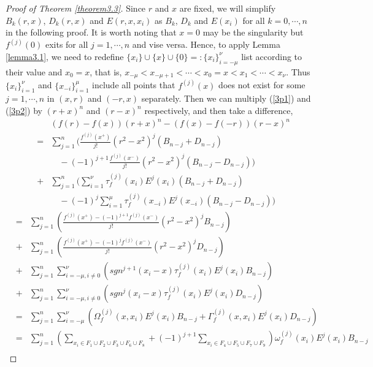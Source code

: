 \documentclass{article}
\begin{document}
\begin{proof}[Proof of Theorem \ref{theorem3.3}]
Since $r$ and $x$ are fixed, we will simplify $B_{k}(r, x)$, $D_{k}(r, x)$ and $E(r, x, x_{i})$ as $B_{k}$, $D_{k}$ and $E(x_{i})$ for all $k=0, \cdots, n$ in the following proof. It is worth noting that $x=0$ may be the singularity but $f^{(j)}(0)$ exits for all $j=1, \cdots, n$ and vise versa. Hence, to apply Lemma \ref{lemma3.1}, we need to redefine $\{x_{i}\}\cup\{x\}\cup\{0\}=:\{x_{i}\}_{i=-\mu}^{\nu}$ list according to their value and $x_{0}=x$, that is, $x_{-\mu}<x_{-\mu+1}<\cdots<x_{0}=x<x_{1}<\cdots<x_{\nu}$. Thus $\{x_{i}\}_{i=1}^{\nu}$ and $\{x_{-i}\}_{i=1}^{\mu}$ include all points that $f^{(j)}(x)$ does not exist for some $j=1, \cdots, n$ in $(x, r)$ and $(-r, x)$ separately. Then we can multiply (\ref{3p1}) and (\ref{3p2}) by $(r+x)^{n}$ and $(r-x)^{n}$ respectively, and then take a difference,
\begin{eqnarray*}
    &&(f(r)-f(x))(r+x)^{n}-(f(x)-f(-r))(r-x)^{n}\\
    &=&\sum_{j=1}^{n}\Bigg(\frac{f^{(j)}(x^{+})}{j!}(r^{2}-x^{2})^{j}(B_{n-j}+D_{n-j})\\
    &&\quad -(-1)^{j+1}\frac{f^{(j)}(x^{-})}{j!}(r^{2}-x^{2})^{j}(B_{n-j}-D_{n-j})\Bigg)\\
    &+&\sum_{j=1}^{n}\Bigg(\sum_{i=1}^{\nu}\tau_{f}^{(j)}(x_{i})E^{j}(x_{i})(B_{n-j}+D_{n-j})\\
    &&\quad -(-1)^{j}\sum_{i=1}^{\mu}\tau_{f}^{(j)}(x_{-i})E^{j}(x_{-i})(B_{n-j}-D_{n-j})\Bigg)
\end{eqnarray*}
\begin{eqnarray*}
    &=&\sum_{j=1}^{n}\left(\frac{f^{(j)}(x^{+})-(-1)^{j+1}f^{(j)}(x^{-})}{j!}(r^{2}-x^{2})^{j}B_{n-j}\right)\\
    &+&\sum_{j=1}^{n}\left(\frac{f^{(j)}(x^{+})-(-1)^{j}f^{(j)}(x^{-})}{j!}(r^{2}-x^{2})^{j}D_{n-j}\right)\\
    &+&\sum_{j=1}^{n}\sum_{i=-\mu, i\neq 0}^{\nu}\left(sgn^{j+1}(x_{i}-x)\tau_{f}^{(j)}(x_{i})E^{j}(x_{i})B_{n-j}\right)\\
    &+&\sum_{j=1}^{n}\sum_{i=-\mu, i\neq 0}^{\nu}\left(sgn^{j}(x_{i}-x)\tau_{f}^{(j)}(x_{i})E^{j}(x_{i})D_{n-j}\right)\\
    &=&\sum_{j=1}^{n}\sum_{i=-\mu}^{\nu}\left(\Omega_{f}^{(j)}(x, x_{i})E^{j}(x_{i})B_{n-j}+\Gamma_{f}^{(j)}(x, x_{i})E^{j}(x_{i})D_{n-j}\right)\\
    &=&\sum_{j=1}^{n}\left(\sum_{x_{i}\in F_{1}\cup F_{2}\cup F_{3}\cup F_{6}\cup F_{8}}+(-1)^{j+1}\sum_{x_{i}\in F_{4}\cup F_{5}\cup F_{7}\cup F_{9}}\right)\omega_{f}^{(j)}(x_{i})E^{j}(x_{i})B_{n-j}\\

\end{eqnarray*}
\end{proof}
\end{document}
